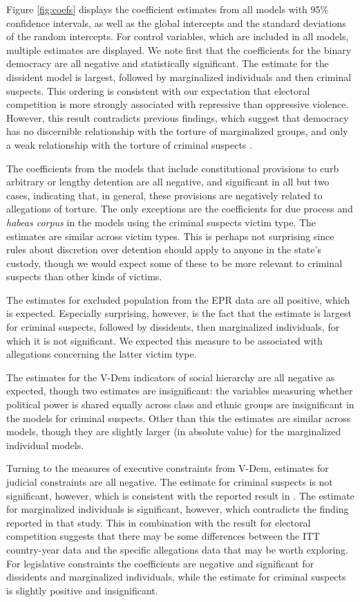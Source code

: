 \documentclass[11pt]{article}
\begin{document}
Figure \ref{fig:coefs} displays the coefficient estimates from all models with 95\% confidence intervals, as well as the global intercepts and the standard deviations of the random intercepts. For control variables, which are included in all models, multiple estimates are displayed. We note first that the coefficients for the binary democracy are all negative and statistically significant. The estimate for the dissident model is largest, followed by marginalized individuals and then criminal suspects. This ordering is consistent with our expectation that electoral competition is more strongly associated with repressive than oppressive violence. However, this result contradicts previous findings, which suggest that democracy has no discernible relationship with the torture of marginalized groups, and only a weak relationship with the torture of criminal suspects \citep{Haschke2018,JacksonHillHall2018}.  

The coefficients from the models that include constitutional provisions to curb arbitrary or lengthy detention are all negative, and significant in all but two cases, indicating that, in general, these provisions are negatively related to allegations of torture. The only exceptions are the coefficients for due process and {\em habeas corpus} in the models using the criminal suspects victim type. The estimates are similar across victim types. This is perhaps not surprising since rules about discretion over detention should apply to anyone in the state's custody, though we would expect some of these to be more relevant to criminal suspects than other kinds of victims.      

The estimates for excluded population from the EPR data are all positive, which is expected. Especially surprising, however, is the fact that the estimate is largest for criminal suspects, followed by dissidents, then marginalized individuals, for which it is not significant. We expected this measure to be associated with allegations concerning the latter victim type. 

The estimates for the V-Dem indicators of social hierarchy are all negative as expected, though two estimates are insignificant: the variables measuring whether political power is shared equally across class and ethnic groups are insignificant in the models for criminal suspects. Other than this the estimates are similar across models, though they are slightly larger (in absolute value) for the marginalized individual models.   

Turning to the measures of executive constraints from V-Dem, estimates for judicial constraints are all negative. The estimate for criminal suspects is not significant, however, which is consistent with the reported result in \citet{JacksonHillHall2018}. The estimate for marginalized individuals is significant, however, which contradicts the finding reported in that study. This in combination with the result for electoral competition suggests that there may be some differences between the ITT country-year data and the specific allegations data that may be worth exploring. For legislative constraints the coefficients are negative and significant for dissidents and marginalized individuals, while the estimate for criminal suspects is slightly positive and insignificant. 
\end{document}

